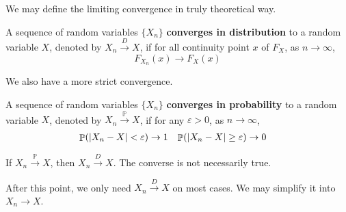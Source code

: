 \documentclass{huhtakm-template-book-v2}
\DeclareMathOperator{\prob}{\mathbb{P}}
\begin{document}
\newpage
We may define the limiting convergence in truly theoretical way.
\begin{defn}
	A sequence of random variables $\{X_{n}\}$ \textbf{converges in distribution} to a random variable $X$, denoted by $X_{n}\xrightarrow{D}X$, if for all continuity point $x$ of $F_{X}$, as $n\to\infty$,
	\begin{equation*}
		F_{X_{n}}(x)\to F_{X}(x)
	\end{equation*}
\end{defn}
We also have a more strict convergence.
\begin{defn}
	A sequence of random variables $\{X_{n}\}$ \textbf{converges in probability} to a random variable $X$, denoted by $X_{n}\xrightarrow{\prob}X$, if for any $\varepsilon>0$, as $n\to\infty$,
	\begin{align*}
		\prob(\abs{X_{n}-X}<\varepsilon)&\to 1 & \prob(\abs{X_{n}-X}\geq\varepsilon)&\to 0
	\end{align*}
\end{defn}
\begin{rem}
	If $X_{n}\xrightarrow{\prob}X$, then $X_{n}\xrightarrow{D}X$. The converse is not necessarily true.
\end{rem}
\begin{rem}
	After this point, we only need $X_{n}\xrightarrow{D}X$ on most cases. We may simplify it into $X_{n}\to X$.
\end{rem}
\end{document}
